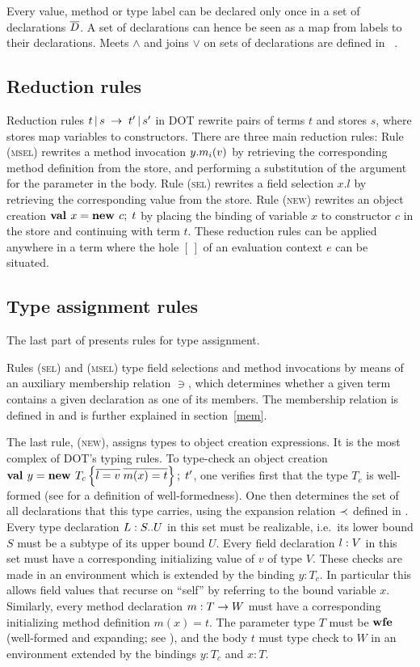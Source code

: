 \documentclass[9pt]{sigplanconf}
\begin{document}
Every value, method or type label can be declared only once in a set of
declarations $\overline{D}$. A set of declarations can hence be seen as a map from
labels to their declarations.  Meets $\wedge$ and joins $\vee$ on sets of
declarations are defined in ~.

\subsection{Reduction rules}

Reduction rules $t \operatorname{|} s \;\rightarrow\; t' \operatorname{|} s'$ in DOT rewrite pairs of
terms $t$ and stores $s$, where stores map variables to constructors.
There are three main reduction rules: Rule (\textsc{msel}) rewrites a
method invocation $y.m_i(v)$ by retrieving the corresponding method
definition from the store, and performing a substitution of the
argument for the parameter in the body. Rule (\textsc{sel}) rewrites a
field selection $x.l$ by retrieving the corresponding value from the
store. Rule (\textsc{new}) rewrites an object creation $\textbf{val }x = \textbf{new }c ;\; t$ by
placing the binding of variable $x$ to constructor $c$ in the store
and continuing with term $t$.  These reduction rules can be applied
anywhere in a term where the hole $[\,]$ of an evaluation context $e$
can be situated.

\subsection{Type assignment rules}

The last part of  presents rules for type
assignment.  

Rules (\textsc{sel}) and (\textsc{msel}) type field selections and
method invocations by means of an auxiliary membership relation $\ni$,
which determines whether a given term contains a given declaration as
one of its members. The membership relation is defined in
 and is further explained in section~\ref{mem}.

The last rule, (\textsc{new}), assigns types to object creation
expressions. It is the most complex of DOT's typing rules.  To
type-check an object creation $\textbf{val }y = \textbf{new }T_c \left\{\overline{l =
      v}\;\overline{m(x) = t}\right\} ;\; t'$, one verifies first that the type $T_c$
is well-formed (see  for a definition of
well-formedness).  One then determines the set of all declarations
that this type carries, using the expansion relation $\prec$ defined
in .  Every type declaration $L : S..U$ in
this set must be realizable, i.e.\ its lower bound $S$ must be a
subtype of its upper bound $U$.  Every field declaration $l : V$
in this set must have a corresponding initializing value of $v$ of
type $V$.  These checks are made in an environment which is extended
by the binding $y: T_c$. In particular this allows field values that
recurse on ``self'' by referring to the bound variable $x$. Similarly,
every method declaration $m : T \rightarrow W$ must have a corresponding
initializing method definition $m(x) = t$. The parameter type $T$ must
be $\mbox{\textbf{wfe}}$ (well-formed and expanding; see ), and
the body $t$ must type check to $W$ in an environment extended by the
bindings $y : T_c$ and $x : T$.
\end{document}
